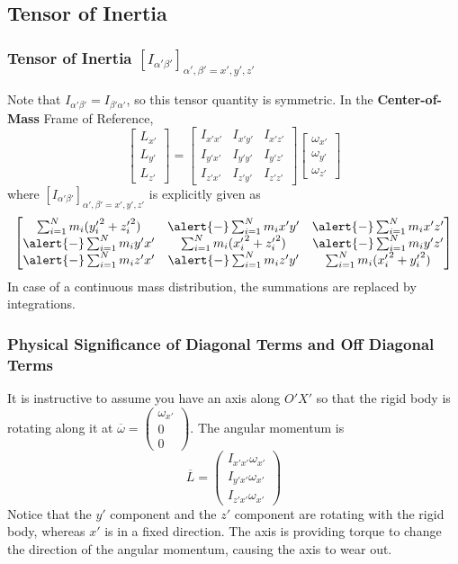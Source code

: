 \subsection{Tensor of Inertia}
\begin{frame}
\frametitle{Tensor of Inertia $\left[I_{\alpha'\beta'}\right]_{\alpha',\beta'=x',y',z'}$}
Note that $I_{\alpha'\beta'}=I_{\beta'\alpha'}$, so this tensor quantity is symmetric.
In the \textbf{Center-of-Mass} Frame of Reference,
\[\left[\begin{matrix}L_{x'}\\L_{y'}\\L_{z'}\end{matrix}\right]=\left[\begin{matrix}I_{x'x'}&I_{x'y'}&I_{x'z'}\\I_{y'x'}&I_{y'y'}&I_{y'z'}\\I_{z'x'}&I_{z'y'}&I_{z'z'}\end{matrix}\right]\left[\begin{matrix}\omega_{x'}\\\omega_{y'}\\\omega_{z'}\end{matrix}\right]\]
where $\left[I_{\alpha'\beta'}\right]_{\alpha',\beta'=x',y',z'}$ is explicitly given as
\[\left[\begin{matrix}\sum_{i=1}^{N}m_i({y_{i}'}^2+{z_{i}'}^2)&\alert{-}\sum_{i=1}^{N}m_{i}x'y'&\alert{-}\sum_{i=1}^{N}m_{i}x'z'\\\alert{-}\sum_{i=1}^{N}m_{i}y'x'&\sum_{i=1}^{N}m_i({x_{i}'}^2+{z_{i}'}^2)&\alert{-}\sum_{i=1}^{N}m_{i}y'z'\\\alert{-}\sum_{i=1}^{N}m_{i}z'x'&\alert{-}\sum_{i=1}^{N}m_{i}z'y'&\sum_{i=1}^{N}m_i({x_{i}'}^2+{y_{i}'}^2)\end{matrix}\right]\]
In case of a continuous mass distribution, the summations are replaced by integrations.
\end{frame}
\begin{frame}
\frametitle{Physical Significance of Diagonal Terms and Off Diagonal Terms}
It is instructive to assume you have an axis along $O'X'$ so that the rigid body is rotating along it at $\overline\omega=\left(\begin{matrix}\omega_{x'}\\0\\0\end{matrix}\right)$.\pause
The angular momentum is
\[\overline L=\left(\begin{matrix}I_{x'x'}\omega_{x'}\\I_{y'x'}\omega_{x'}\\I_{z'x'}\omega_{x'}\end{matrix}\right)\] 
Notice that the $y'$ component and the $z'$ component are rotating with the rigid body, whereas $x'$ is in a fixed direction. The axis is providing torque to change the direction of the angular momentum, causing the axis to wear out.
\end{frame}
